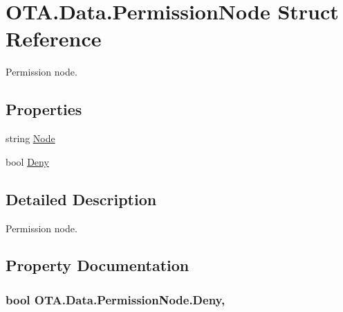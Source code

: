 \hypertarget{struct_o_t_a_1_1_data_1_1_permission_node}{}\section{O\+T\+A.\+Data.\+Permission\+Node Struct Reference}
\label{struct_o_t_a_1_1_data_1_1_permission_node}


Permission node.  


\subsection*{Properties}
\begin{DoxyCompactItemize}
\item 
string \hyperlink{struct_o_t_a_1_1_data_1_1_permission_node_aa9694d82e9aaeecb9426adeb134481e6}{Node}
\item 
bool \hyperlink{struct_o_t_a_1_1_data_1_1_permission_node_ac41921bb04f3b2ba02de8287543944c6}{Deny}
\end{DoxyCompactItemize}


\subsection{Detailed Description}
Permission node. 



\subsection{Property Documentation}
\hypertarget{struct_o_t_a_1_1_data_1_1_permission_node_ac41921bb04f3b2ba02de8287543944c6}{}
\subsubsection[{Deny}]{\setlength{\rightskip}{0pt plus 5cm}bool O\+T\+A.\+Data.\+Permission\+Node.\+Deny\hspace{0.3cm}{\ttfamily [get]}, {\ttfamily [set]}}\label{struct_o_t_a_1_1_data_1_1_permission_node_ac41921bb04f3b2ba02de8287543944c6}
\hypertarget{struct_o_t_a_1_1_data_1_1_permission_node_aa9694d82e9aaeecb9426adeb134481e6}{}
